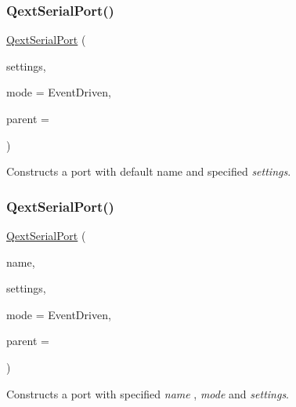 \subsubsection{\texorpdfstring{QextSerialPort()}{QextSerialPort()}\hspace{0.1cm}{\footnotesize\ttfamily [3/4]}}
{\footnotesize\ttfamily \mbox{\hyperlink{class_qext_serial_port}{Qext\+Serial\+Port}} (\begin{DoxyParamCaption}\item[{const \mbox{\hyperlink{struct_port_settings}{Port\+Settings}} \&}]{settings,  }\item[{\mbox{\hyperlink{class_qext_serial_port_a269e1f3656224a10c321bd70ab89cf64}{Qext\+Serial\+Port\+::\+Query\+Mode}}}]{mode = {\ttfamily EventDriven},  }\item[{Q\+Object $\ast$}]{parent = {} }\end{DoxyParamCaption})\hspace{0.3cm}{\ttfamily [explicit]}}

Constructs a port with default name and specified {\itshape settings}. \mbox{\label{class_qext_serial_port_a31c6182fc721b775231c5cc4b1ab98de}} 
\subsubsection{\texorpdfstring{QextSerialPort()}{QextSerialPort()}\hspace{0.1cm}{\footnotesize\ttfamily [4/4]}}
{\footnotesize\ttfamily \mbox{\hyperlink{class_qext_serial_port}{Qext\+Serial\+Port}} (\begin{DoxyParamCaption}\item[{const Q\+String \&}]{name,  }\item[{const \mbox{\hyperlink{struct_port_settings}{Port\+Settings}} \&}]{settings,  }\item[{\mbox{\hyperlink{class_qext_serial_port_a269e1f3656224a10c321bd70ab89cf64}{Qext\+Serial\+Port\+::\+Query\+Mode}}}]{mode = {\ttfamily EventDriven},  }\item[{Q\+Object $\ast$}]{parent = {} }\end{DoxyParamCaption})}

Constructs a port with specified {\itshape name} , {\itshape mode} and {\itshape settings}. \mbox{\label{class_qext_serial_port_af2c6a3071f1aa5d50e77ed31a453fed8}} 
